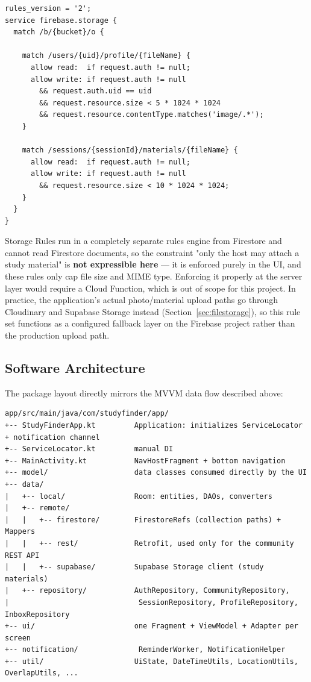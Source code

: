\begin{verbatim}
rules_version = '2';
service firebase.storage {
  match /b/{bucket}/o {

    match /users/{uid}/profile/{fileName} {
      allow read:  if request.auth != null;
      allow write: if request.auth != null
        && request.auth.uid == uid
        && request.resource.size < 5 * 1024 * 1024
        && request.resource.contentType.matches('image/.*');
    }

    match /sessions/{sessionId}/materials/{fileName} {
      allow read:  if request.auth != null;
      allow write: if request.auth != null
        && request.resource.size < 10 * 1024 * 1024;
    }
  }
}
\end{verbatim}

Storage Rules run in a completely separate rules engine from Firestore and cannot read Firestore documents, so the constraint "only the host may attach a study material" is \textbf{not expressible here} — it is enforced purely in the UI, and these rules only cap file size and MIME type. Enforcing it properly at the server layer would require a Cloud Function, which is out of scope for this project. In practice, the application's actual photo/material upload paths go through Cloudinary and Supabase Storage instead (Section~\ref{sec:filestorage}), so this rule set functions as a configured fallback layer on the Firebase project rather than the production upload path.

\subsection{Software Architecture}

The package layout directly mirrors the MVVM data flow described above:

\begin{verbatim}
app/src/main/java/com/studyfinder/app/
+-- StudyFinderApp.kt         Application: initializes ServiceLocator + notification channel
+-- ServiceLocator.kt         manual DI
+-- MainActivity.kt           NavHostFragment + bottom navigation
+-- model/                    data classes consumed directly by the UI
+-- data/
|   +-- local/                Room: entities, DAOs, converters
|   +-- remote/
|   |   +-- firestore/        FirestoreRefs (collection paths) + Mappers
|   |   +-- rest/             Retrofit, used only for the community REST API
|   |   +-- supabase/         Supabase Storage client (study materials)
|   +-- repository/           AuthRepository, CommunityRepository,
|                              SessionRepository, ProfileRepository, InboxRepository
+-- ui/                       one Fragment + ViewModel + Adapter per screen
+-- notification/              ReminderWorker, NotificationHelper
+-- util/                     UiState, DateTimeUtils, LocationUtils, OverlapUtils, ...
\end{verbatim}

